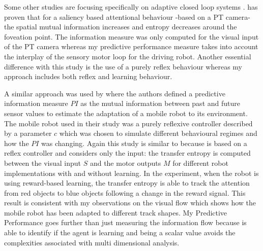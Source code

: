 Some other studies are focusing specifically on adaptive closed loop systems \citep{Porr2006cf,Kulvicius2010:infomeasure,LungarellaSporns2006:MappingFlow}.
\citet{Lungarella2005:MethodsInfo} has proven that for a saliency based attentional behaviour
-based on a PT camera- 
the spatial mutual information increases and entropy decreases around the foveation point.
The information measure was only computed for the visual input of the 
PT camera whereas my predictive performance measure takes into
account the interplay of the sensory motor loop for the driving robot.
Another essential difference with this study is the use
of a purely reflex behaviour whereas my approach includes both
reflex and learning behaviour.

A similar approach was used by \citet{Der2008:PredictiveInfo,Ay2008:PredInformation}
 where the authors defined a predictive information measure $PI$ as the mutual
 information between past and future sensor values to estimate the adaptation
 of a mobile robot to its environment. The mobile robot used in their study was a purely 
reflexive controller described by a parameter $c$ which was chosen to simulate
 different behavioural regimes and how the $PI$ was changing.
Again this study is similar to \citet{Lungarella2005:MethodsInfo} because
 is based on a reflex controller and considers only the input:
the transfer entropy is computed between the visual input $S$ and the motor outputs
$M$ for different robot implementations with and without learning.
In the experiment, when the robot is using reward-based learning, the 
transfer entropy is able to track the attention from red objects to blue objects
following a change in the reward signal.
This result is consistent with my observations on the visual flow which shows
how the mobile robot has been adapted to different track shapes.
My Predictive Performance goes further than just measuring the 
information flow because is able to identify if the agent is learning
and being a scalar value avoids the complexities associated with multi dimensional analysis.

